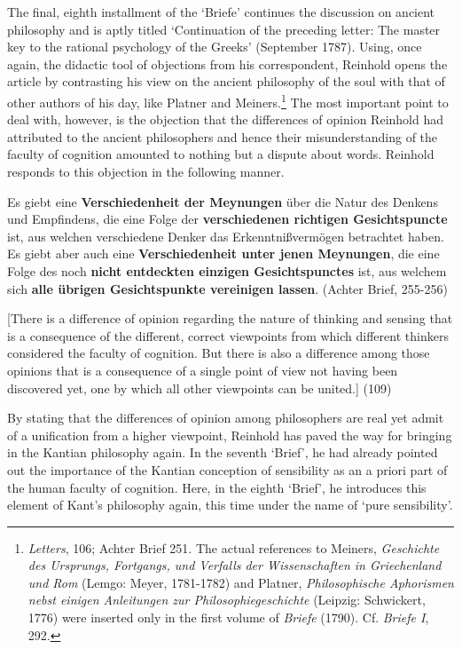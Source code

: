  The final, eighth installment of the `Briefe' continues the discussion on ancient philosophy and is aptly titled `Continuation of the preceding letter: The master key to the rational psychology of the Greeks' (September 1787). Using, once again, the didactic tool of objections from his correspondent, Reinhold opens the article by contrasting his view on the ancient philosophy of the soul with that of other authors of his day, like Platner and Meiners.\footnote{ \textit{Letters}, 106; Achter Brief 251. The actual references to Meiners, \textit{Geschichte des Ursprungs, Fortgangs, und Verfalls der Wissenschaften in Griechenland und Rom} (Lemgo: Meyer, 1781{-}1782) and Platner, \textit{Philosophische Aphorismen nebst einigen Anleitungen zur Philosophiegeschichte} (Leipzig: Schwickert, 1776) were inserted only in the first volume of \textit{Briefe} (1790). Cf. \textit{Briefe I}, 292. } The most important point to deal with, however, is the objection that the differences of opinion Reinhold had attributed to the ancient philosophers and hence their misunderstanding of the faculty of cognition amounted to nothing but a dispute about words. Reinhold responds to this objection in the following manner. 

Es giebt eine \textbf{Verschiedenheit der Meynungen }\"{u}ber die Natur des Denkens und Empfindens, die eine Folge der \textbf{verschiedenen richtigen Gesichtspuncte} ist, aus welchen verschiedene Denker das Erkenntni\ss{}verm\"{o}gen betrachtet haben. Es giebt aber auch eine \textbf{Verschiedenheit unter jenen Meynungen}, die eine Folge des noch \textbf{nicht entdeckten einzigen Gesichtspunctes} ist, aus welchem sich \textbf{alle \"{u}brigen Gesichtspunkte vereinigen lassen}. (Achter Brief, 255{-}256)

[There is a difference of opinion regarding the nature of thinking and sensing that is a consequence of the different, correct viewpoints from which different thinkers considered the faculty of cognition. But there is also a difference among those opinions that is a consequence of a single point of view not having been discovered yet, one by which all other viewpoints can be united.] (109)

By stating that the differences of opinion among philosophers are real yet admit of a unification from a higher viewpoint, Reinhold has paved the way for bringing in the Kantian philosophy again. In the seventh `Brief', he had already pointed out the importance of the Kantian conception of sensibility as an a priori part of the human faculty of cognition. Here, in the eighth `Brief', he introduces this element of Kant's philosophy again, this time under the name of `pure sensibility'.

